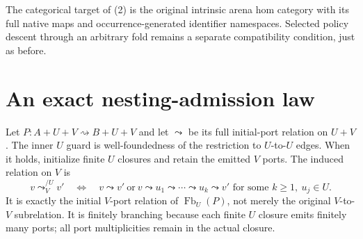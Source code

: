 \documentclass[11pt]{article}
\begin{document}
The categorical target of (2) is the original intrinsic arena hom category with its full native maps and occurrence-generated identifier namespaces. Selected policy descent through an arbitrary fold remains a separate compatibility condition, just as before.

\section{An exact nesting-admission law}
Let $P:A+U+V\rightsquigarrow B+U+V$ and let $\leadsto$ be its full initial-port relation on $U+V$. The inner $U$ guard is well-foundedness of the restriction to $U$-to-$U$ edges. When it holds, initialize finite $U$ closures and retain the emitted $V$ ports. The induced relation on $V$ is
\[
 v\leadsto^{/U}_V v'
 \quad\Longleftrightarrow\quad
 v\leadsto v'\ \text{or}\
 v\leadsto u_1\leadsto\cdots\leadsto u_k\leadsto v'
 \text{ for some }k\geq1,\ u_j\in U.                      \tag{4}
\]
It is exactly the initial $V$-port relation of $\operatorname{Fb}_U(P)$, not merely the original $V$-to-$V$ subrelation. It is finitely branching because each finite $U$ closure emits finitely many ports; all port multiplicities remain in the actual closure.
\end{document}
